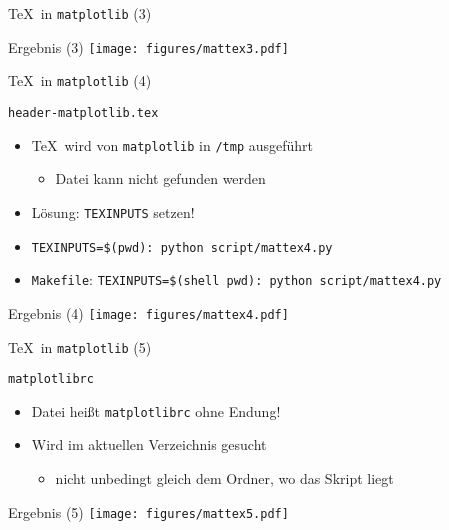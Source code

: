 \begin{frame}[fragile]{\TeX\ in \texttt{matplotlib} (3)}
\end{frame}

\AddToShipoutPictureFG*{\ShowFramePicture}
\begin{frame}{Ergebnis (3)}
  \centering
  \texttt{[image: figures/mattex3.pdf]}
\end{frame}

\begin{frame}[fragile]{\TeX\ in \texttt{matplotlib} (4)}
\end{frame}

\begin{frame}[fragile]{\texttt{header-matplotlib.tex}}
  

  \vspace*{-0.5em}
  \begin{itemize}
    \item \TeX\ wird von \texttt{matplotlib} in \texttt{/tmp} ausgeführt
      \begin{itemize}
        \item Datei kann nicht gefunden werden
      \end{itemize}
    \item Lösung: \texttt{TEXINPUTS} setzen!
    \item \texttt{TEXINPUTS=\$(pwd): python script/mattex4.py}
    \item \texttt{Makefile}: \texttt{TEXINPUTS=\$(shell pwd): python script/mattex4.py}
  \end{itemize}
  \vspace*{-1em}
\end{frame}

\AddToShipoutPictureFG*{\ShowFramePicture}
\begin{frame}{Ergebnis (4)}
  \centering
  \texttt{[image: figures/mattex4.pdf]}
\end{frame}

\begin{frame}[fragile]{\TeX\ in \texttt{matplotlib} (5)}
\end{frame}

\begin{frame}[fragile]{\texttt{matplotlibrc}}
  \lstMatplotlibrcSettings
  

  \begin{itemize}
    \item Datei heißt \texttt{matplotlibrc} ohne Endung!
    \item Wird im aktuellen Verzeichnis gesucht
      \begin{itemize}
        \item nicht unbedingt gleich dem Ordner, wo das Skript liegt
      \end{itemize}
  \end{itemize}
\end{frame}

\AddToShipoutPictureFG*{\ShowFramePicture}
\begin{frame}{Ergebnis (5)}
  \centering
  \texttt{[image: figures/mattex5.pdf]}
\end{frame}
